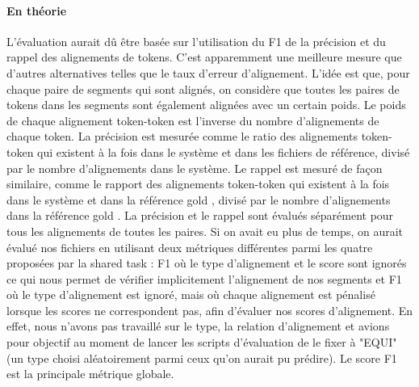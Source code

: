 \documentclass[a4paper, twoside, 11pt]{article}
\begin{document}
 \paragraph{En théorie}
 L'évaluation aurait dû être basée sur l'utilisation du F1 de la précision et du rappel des alignements de tokens. C'est apparemment une meilleure mesure que d'autres alternatives telles que le taux d'erreur d'alignement. L'idée est que, pour chaque paire de segments qui sont alignés, on considère que toutes les paires de tokens dans les segments sont également alignées avec un certain poids. Le poids de chaque alignement token-token est l'inverse du nombre d'alignements de chaque token. La précision est mesurée comme le ratio des alignements token-token qui existent à la fois dans le système et dans les fichiers de référence, divisé par le nombre d'alignements dans le système. Le rappel est mesuré de façon similaire, comme le rapport des alignements token-token qui existent à la fois dans le système et dans la référence \og gold \fg{}, divisé par le nombre d'alignements dans la référence \og gold \fg{}. La précision et le rappel sont évalués séparément pour tous les alignements de toutes les paires. Si on avait eu plus de temps, on aurait évalué nos fichiers en utilisant deux métriques différentes parmi les quatre proposées par la \og shared task\fg{} : F1 où le type d'alignement et le score sont ignorés ce qui nous permet de vérifier implicitement l'alignement de nos segments et F1 où le type d'alignement est ignoré, mais où chaque alignement est pénalisé lorsque les scores ne correspondent pas, afin d'évaluer nos scores d'alignement. En effet, nous n'avons pas travaillé sur le type, la relation d'alignement et avions pour objectif au moment de lancer les scripts d'évaluation de le fixer à "EQUI" (un type choisi aléatoirement parmi ceux qu'on aurait pu prédire). Le score F1 est la principale métrique globale.
\end{document}
